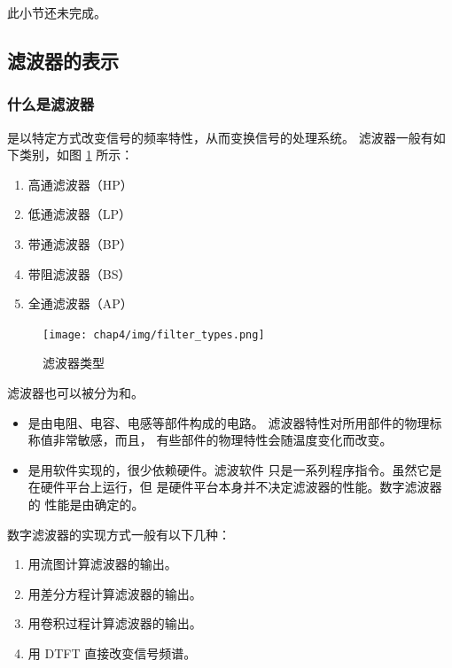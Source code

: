 \begin{note}
    此小节还未完成。
\end{note}

\subsection{滤波器的表示}

\subsubsection{什么是滤波器}

\begin{definition}[滤波器]
    是以特定方式改变信号的频率特性，从而变换信号的处理系统。
    滤波器一般有如下类别，如图 \ref{fig:filter-types} 所示：
    \begin{enumerate}[label=(\arabic*)]
        \item 高通滤波器（HP）
        \item 低通滤波器（LP）
        \item 带通滤波器（BP）
        \item 带阻滤波器（BS）
        \item 全通滤波器（AP）
    \end{enumerate}
    \begin{figure}[H]
        \centering
        \texttt{[image: chap4/img/filter\_types.png]}
        \caption{滤波器类型}
        \label{fig:filter-types}
    \end{figure}

    滤波器也可以被分为和。
    \begin{itemize}
        \item {}是由电阻、电容、电感等部件构成的电路。
            滤波器特性对所用部件的物理标称值非常敏感，而且，
            有些部件的物理特性会随温度变化而改变。
        \item {}是用软件实现的，很少依赖硬件。滤波软件
            只是一系列程序指令。虽然它是在硬件平台上运行，但
            是硬件平台本身并不决定滤波器的性能。数字滤波器的
            性能是由确定的。
    \end{itemize}
    数字滤波器的实现方式一般有以下几种：
    \begin{enumerate}
        \item 用流图计算滤波器的输出。
        \item 用差分方程计算滤波器的输出。
        \item 用卷积过程计算滤波器的输出。
        \item 用 DTFT 直接改变信号频谱。
    \end{enumerate}
\end{definition}

